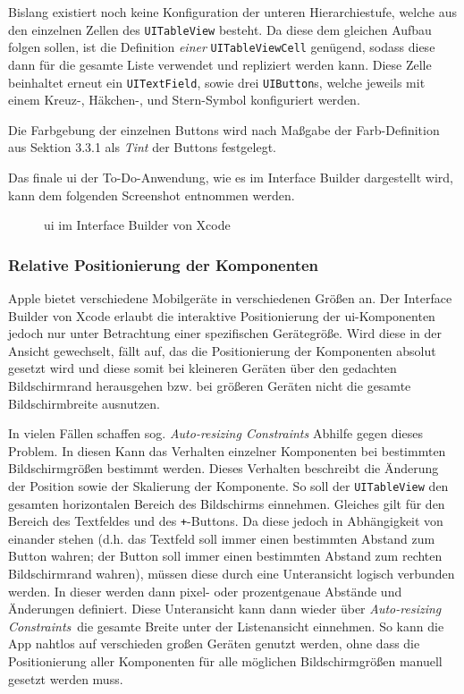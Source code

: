 Bislang existiert noch keine Konfiguration der unteren Hierarchiestufe, welche aus den einzelnen Zellen des \texttt{UITableView} besteht. Da diese dem gleichen Aufbau folgen sollen, ist die Definition \textit{einer} \texttt{UITableViewCell} genügend, sodass diese dann für die gesamte Liste verwendet und repliziert werden kann. Diese Zelle beinhaltet erneut ein \texttt{UITextField}, sowie drei \texttt{UIButton}s, welche jeweils mit einem Kreuz-, Häkchen-, und Stern-Symbol konfiguriert werden.

Die Farbgebung der einzelnen Buttons wird nach Maßgabe der Farb-Definition aus Sektion 3.3.1 als \textit{Tint} der Buttons festgelegt.

Das finale \ac{ui} der To-Do-Anwendung, wie es im Interface Builder dargestellt wird, kann dem folgenden Screenshot entnommen werden.

\begin{figure}[h!]
	\centering
	\caption{\ac{ui} im Interface Builder von Xcode}
\end{figure}

\subsubsection{Relative Positionierung der Komponenten}
Apple bietet verschiedene Mobilgeräte in verschiedenen Größen an. Der Interface Builder von Xcode erlaubt die interaktive Positionierung der \ac{ui}-Komponenten jedoch nur unter Betrachtung einer spezifischen Gerätegröße. Wird diese in der Ansicht gewechselt, fällt auf, das die Positionierung der Komponenten absolut gesetzt wird und diese somit bei kleineren Geräten über den gedachten Bildschirmrand herausgehen bzw. bei größeren Geräten nicht die gesamte Bildschirmbreite ausnutzen.

In vielen Fällen schaffen sog. \textit{Auto-resizing Constraints} Abhilfe gegen dieses Problem. In diesen Kann das Verhalten einzelner Komponenten bei bestimmten Bildschirmgrößen bestimmt werden. Dieses Verhalten beschreibt die Änderung der Position sowie der Skalierung der Komponente. So soll der \texttt{UITableView} den gesamten horizontalen Bereich des Bildschirms einnehmen. Gleiches gilt für den Bereich des Textfeldes und des \texttt{+}-Buttons. Da diese jedoch in Abhängigkeit von einander stehen (d.h. das Textfeld soll immer einen bestimmten Abstand zum Button wahren; der Button soll immer einen bestimmten Abstand zum rechten Bildschirmrand wahren), müssen diese durch eine Unteransicht logisch verbunden werden. In dieser werden dann pixel- oder prozentgenaue Abstände und Änderungen definiert. Diese Unteransicht kann dann wieder über \textit{Auto-resizing Constraints} die gesamte Breite unter der Listenansicht einnehmen. So kann die App nahtlos auf verschieden großen Geräten genutzt werden, ohne dass die Positionierung aller Komponenten für alle möglichen Bildschirmgrößen manuell gesetzt werden muss.

